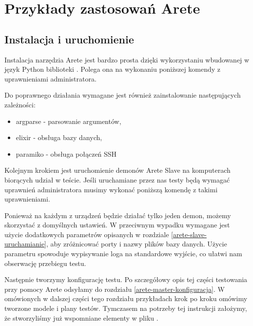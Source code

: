 \documentclass[00-praca-magisterska.tex]{subfiles}
\begin{document}
\chapter{Przykłady zastosowań Arete}
\label{demonstracja-arete}

\section{Instalacja i uruchomienie}
\label{instalacja-i-uruchomienie-arete}

Instalacja narzędzia Arete jest bardzo prosta dzięki wykorzystaniu wbudowanej w
język Python biblioteki  \cite{distutils}. Polega ona na
wykonaniu poniższej komendy z uprawnieniami administratora.


Do poprawnego działania wymagane jest również zainstalowanie następujących
zależności:

\begin{itemize}
\item{argparse \cite{argparse} - parsowanie argumentów,}
\item{elixir \cite{elixir} - obsługa bazy danych,}
\item{paramiko \cite{paramiko} - obsługa połączeń SSH}
\end{itemize}

Kolejnym krokiem jest uruchomienie demonów Arete Slave na komputerach biorących
udział w teście. Jeśli uruchamiane przez nas testy będą wymagać uprawnień
administratora musimy wykonać poniższą komendę z takimi uprawnieniami.


Ponieważ na każdym z urządzeń będzie działać tylko jeden demon, możemy
skorzystać z domyślnych ustawień. W przeciwnym wypadku wymagane jest użycie
dodatkowych parametrów opisanych w rozdziale \ref{arete-slave-uruchamianie}, aby
zróżnicować porty i nazwy plików bazy danych. Użycie parametru 
spowoduje wypisywanie loga na standardowe wyjście, co ułatwi nam obserwację
przebiegu testu. 

Następnie tworzymy konfigurację testu. Po szczegółowy opis tej części
testowania przy pomocy Arete odsyłamy do rozdziału \ref{arete-master-konfiguracja}.
W omówionych w dalszej części tego rozdziału przykładach krok po kroku omówimy
tworzone modele i plany testów. Tymczasem na potrzeby tej instrukcji założymy,
że stworzyliśmy już wspomniane elementy w pliku .
\end{document}
